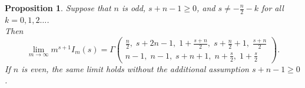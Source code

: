 \documentclass{article}
\theoremstyle{boldremark}
\newtheorem{proposition}{Proposition}[section]
\renewcommand\[{\begin{equation}}
\renewcommand\]{\end{equation}}
\theoremstyle{definition}
\numberwithin{equation}{section}
\begin{document}
\begin{proposition} \label{Prop 5.1}
Suppose that \(n\) is odd, \(s+n-1\geq0\), and
$s\neq -\frac n2-k$ for all $k =0,1,2\dots$.\\
Then
\begin{equation}\label{vysledek}
\lim_{m\to\infty} m^{s+1} I_m(s)
=
\Gamma\!\left(
\begin{matrix}
\frac n2,\; s+2n-1,\; 1+\frac{s+n}{2},\; s+\frac n2+1,\; \frac{s+n}{2}
\\[4 pt]
n-1,\; n-1,\; s+n+1,\; n+\frac s2,\; 1+\frac s2
\end{matrix}
\right).
\end{equation}
If \(n\) is even, the same limit holds without the additional assumption \(s+n-1\geq0\).
\end{proposition}
\end{document}
